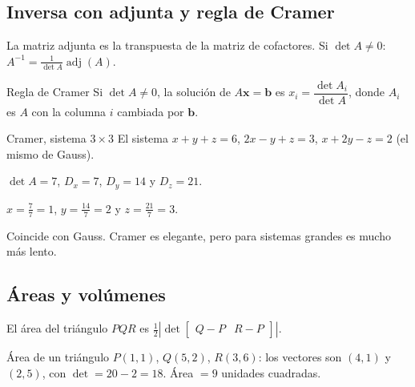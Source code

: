 \subsection{Inversa con adjunta y regla de Cramer}
La matriz adjunta es la transpuesta de la matriz de cofactores. Si $\det A\neq0$: $A^{-1}=\frac{1}{\det A}\operatorname{adj}(A)$.

\begin{tmdef}{Regla de Cramer}
Si $\det A\neq0$, la soluci\'on de $A\mathbf{x}=\mathbf{b}$ es $x_i=\dfrac{\det A_i}{\det A}$, donde $A_i$ es $A$ con la columna $i$ cambiada por $\mathbf{b}$.
\end{tmdef}

\begin{tmejemplo}{Cramer, sistema $3\times3$}
El sistema $x+y+z=6$, $2x-y+z=3$, $x+2y-z=2$ (el mismo de Gauss).
\begin{tmpasos}
\item $\det A=7$, $D_x=7$, $D_y=14$ y $D_z=21$.
\item $x=\frac77=1$, $y=\frac{14}{7}=2$ y $z=\frac{21}{7}=3$.
\end{tmpasos}
Coincide con Gauss. Cramer es elegante, pero para sistemas grandes es mucho m\'as lento.
\end{tmejemplo}

\subsection{\'Areas y vol\'umenes}
\begin{center}
\end{center}
El \'area del tri\'angulo $PQR$ es $\frac12\left|\det\begin{bmatrix}Q-P&R-P\end{bmatrix}\right|$.

\begin{tmejemplo}{\'Area de un tri\'angulo}
$P(1, 1)$, $Q(5, 2)$, $R(3, 6)$: los vectores son $(4, 1)$ y $(2, 5)$, con $\det=20-2=18$. \'Area $=9$ unidades cuadradas.
\end{tmejemplo}

